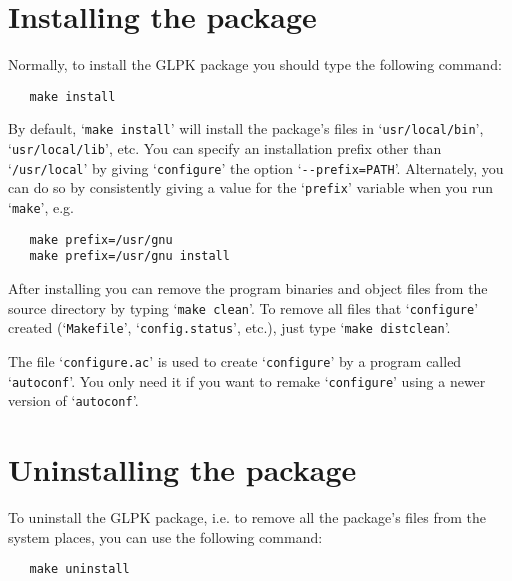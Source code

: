 \section{Installing the package}

Normally, to install the GLPK package you should type the following
command:

\begin{verbatim}
   make install
\end{verbatim}

\noindent
By default, `\verb|make install|' will install the package's files in
`\verb|usr/local/bin|', `\verb|usr/local/lib|', etc. You can specify an
installation prefix other than `\verb|/usr/local|' by giving
`\verb|configure|' the option `\verb|--prefix=PATH|'. Alternately, you
can do so by consistently giving a value for the `\verb|prefix|'
variable when you run `\verb|make|', e.g.

\begin{verbatim}
   make prefix=/usr/gnu
   make prefix=/usr/gnu install
\end{verbatim}

After installing you can remove the program binaries and object files
from the source directory by typing `\verb|make clean|'. To remove all
files that `\verb|configure|' created (`\verb|Makefile|',
`\verb|config.status|', etc.), just type `\verb|make distclean|'.

The file `\verb|configure.ac|' is used to create `\verb|configure|' by
a program called `\verb|autoconf|'. You only need it if you want to
remake `\verb|configure|' using a newer version of `\verb|autoconf|'.

\section{Uninstalling the package}

To uninstall the GLPK package, i.e. to remove all the package's files
from the system places, you can use the following command:

\begin{verbatim}
   make uninstall
\end{verbatim}

